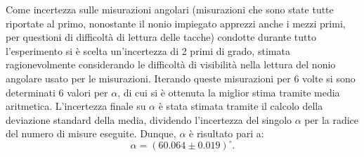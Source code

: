 \documentclass[a4paper,12pt]{article}
\begin{document}
Come incertezza sulle misurazioni angolari (misurazioni che sono state tutte riportate al primo, nonostante il nonio impiegato apprezzi anche i mezzi primi, per questioni di difficoltà di lettura delle tacche) condotte durante tutto l’esperimento si è scelta un’incertezza di 2 primi di grado, stimata ragionevolmente considerando le difficoltà di visibilità nella lettura del nonio angolare usato per le misurazioni. 
Iterando queste misurazioni per 6 volte si sono determinati 6 valori per \( \alpha \), di cui si è ottenuta la miglior stima tramite media aritmetica. L’incertezza finale su \( \alpha \) è stata stimata tramite il calcolo della deviazione standard della media, dividendo l'incertezza del singolo \(\alpha\) per la radice del numero di misure eseguite.
Dunque, \( \alpha \) è risultato pari a:
\[\alpha = (60.064 \pm 0.019)^\circ.\] 
\end{document}
